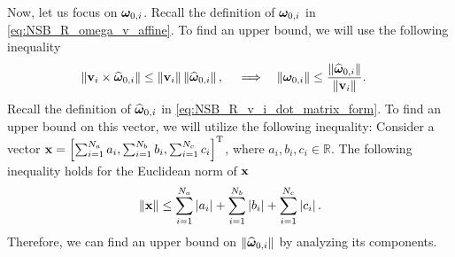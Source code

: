 Now, let us focus on $\bm{\omega}_{0, i}$.
Recall the definition of $\bm{\omega}_{0, i}$ in \eqref{eq:NSB_R_omega_v_affine}.
To find an upper bound, we will use the following inequality
\begin{align}
    \left\|\mathbf{v}_i \times \widehat{\bm{\omega}}_{0, i}\right\| &\leq \left\|\mathbf{v}_i\right\|\left\|\widehat{\bm{\omega}}_{0, i}\right\|, &
    & \implies &
    \left\|\bm{\omega}_{0, i}\right\| &\leq \frac{\left\|\widehat{\bm{\omega}}_{0, i}\right\|}{\left\|\mathbf{v}_i\right\|}.
\end{align}
Recall the definition of $\widehat{\bm{\omega}}_{0, i}$ in \eqref{eq:NSB_R_v_i_dot_matrix_form}.
To find an upper bound on this vector, we will utilize the following inequality:
Consider a vector $\mathbf{x} = \left[\sum_{i=1}^{N_a} a_i, \sum_{i=1}^{N_b} b_i, \sum_{i=1}^{N_c} c_i\right]^{\mathrm{T}}$, where $a_i, b_i, c_i \in \mathbb{R}$.
The following inequality holds for the Euclidean norm of $\mathbf{x}$
\begin{equation}
    \left\|\mathbf{x}\right\| \leq \sum_{i=1}^{N_a} \left|a_i\right| + \sum_{i=1}^{N_b} \left|b_i\right| + \sum_{i=1}^{N_c} \left|c_i\right|.
\end{equation}
Therefore, we can find an upper bound on $\left\|\widehat{\bm{\omega}}_{0, i}\right\|$ by analyzing its components.


